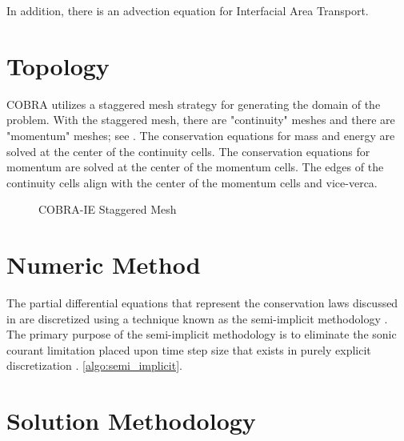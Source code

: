 In addition, there is an advection equation for Interfacial Area Transport.

\section{Topology}
\label{sect:cobra_topology}

COBRA utilizes a staggered mesh strategy for generating the domain of the problem. 
With the staggered mesh, there are "continuity" meshes and there are "momentum" meshes; see .
The conservation equations for mass and energy are solved at the center of the continuity cells.
The conservation equations for momentum are solved at the center of the momentum cells.
The edges of the continuity cells align with the center of the momentum cells and vice-verca.

\begin{figure}[ht]
\caption{COBRA-IE Staggered Mesh}
\label{fig:staggered_mesh}
\begin{center}
\end{center}
\end{figure}
 

\section{Numeric Method}
\label{sect:cobra_numeric_method}
The partial differential equations that represent the conservation laws discussed in  are discretized using a technique known as the semi-implicit methodology \cite{Liles1978}.
The primary purpose of the semi-implicit methodology is to eliminate the sonic courant limitation placed upon time step size that exists in purely explicit discretization \cite{someone}. \ref{algo:semi_implicit}.

\section{Solution Methodology}
\label{sect:cobra_solution_methodology}

